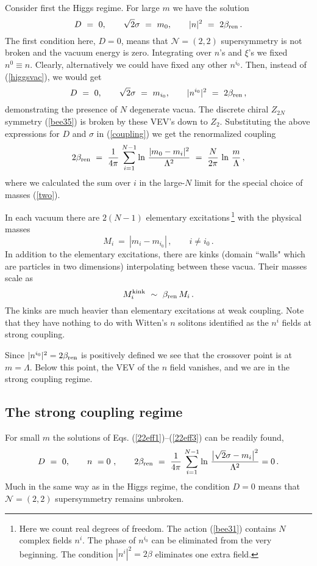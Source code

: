 \documentclass[epsfig,12pt]{article}
\def\beq{\begin{equation}}
\def\eeq{\end{equation}}
\def\beq{\begin{equation}}
\def\eeq{\end{equation}}
\newcommand{\ntwot}{${\mathcal N}= \left(2,2\right) $ }
\begin{document}
Consider first the Higgs regime.
For large $m$ we have the solution
\beq
D~=~0,\qquad \sqrt{2}\sigma~=~m_0,\qquad |n|^2~=~2\beta_{\rm ren} \,.
\label{higgsvac}
\eeq
The first condition here, $D=0$, means that \ntwot supersymmetry is not broken and the vacuum
energy is zero. Integrating over $n$'s and $\xi$'s we fixed $n^{0}\equiv n$. Clearly,
alternatively  we could have fixed
any other $n^{i_0}$. Then, instead of (\ref{higgsvac}), we would get
\beq
D~=~0,\qquad \sqrt{2}\sigma~=~m_{i_0},\qquad |n^{i_0}|^2~=~2\beta_{\rm ren}\,,
\label{higgsvacN}
\eeq
demonstrating the  presence of $N$ degenerate vacua. The discrete chiral $Z_{2N}$ symmetry (\ref{bee35})
is broken by these VEV's down to $Z_2$. Substituting 
the above  expressions   for $D$ and $\sigma$ in (\ref{coupling})
we get the renormalized coupling 
\beq
2\beta_{\rm ren}~=~\frac{1}{4\pi}\, 
\sum_{i=1}^{N-1}\ln\, {\frac{|m_{0}-m_i|^2}{\Lambda^2}}~=~\frac{N}{2\pi}\,\ln\,{\frac{m}{\Lambda}}\, ,
\label{22higgscoupling}
\eeq
where we calculated the sum over $i$ in the large-$N$ limit for the special choice of masses
(\ref{two}).

In each vacuum there are $2(N-1)$ elementary excitations\,\footnote{Here we count
real degrees of
freedom. The action (\ref{bee31}) contains $N$ complex fields
$n^i$.
The phase of $n^{i_0}$ can be eliminated from the very beginning.
The condition $|n^i|^2 = 2\beta$ eliminates one extra field.} 
with the physical masses
\beq
M_i ~=~ |m_i-m_{i_0}|\,,\qquad i\neq i_0\,.
\label{elmass}
\eeq
In addition to the elementary excitations, there are kinks (domain ``walls" which are particles in two
dimensions) interpolating between these vacua. 
Their masses scale as
\beq
M^{\rm kink}_{i} ~\sim~ \beta_{\rm ren}\,M_i \,.
\label{kinkmass}
\eeq
The kinks  are much  heavier than elementary
excitations at weak coupling. Note that they have nothing to do
with Witten's $n$ solitons \cite{W79} identified as the $n^i$ fields at
strong coupling.

Since $|n^{i_0}|^2=2\beta_{\rm ren}$ is positively defined we see that the crossover point is
at $m=\Lambda$. Below this point, the VEV of the $n$ field vanishes,
 and we are in the strong coupling regime.

\subsection{The strong coupling regime}
\label{tscreg}

For small $m$ the
solutions of Eqs. (\ref{22eff1})--(\ref{22eff3}) can be readily found,
\beq
D~=~0,\qquad n~=0~,\qquad
2\beta_{\rm ren}~=~\frac{1}{4\pi}\, 
\sum_{i=1}^{N-1}\ln\, {\frac{\bigl|\sqrt{2}\sigma-m_i\bigr|^2}{\Lambda^2}}=0 \,.
\label{strongvac}
\eeq
Much in the same way as in the Higgs regime, the condition $D=0$ means that   \ntwot
 supersymmetry remains unbroken.
\end{document}
